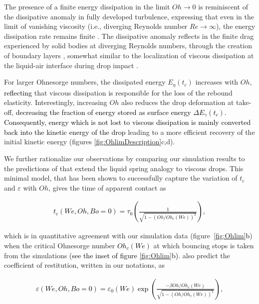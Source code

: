 \documentclass{jfm}
\newcommand{\Ohn}{\mathit{Oh}}
\newcommand{\Ohc}{\mathit{Oh}_\mathit{c}}
\newcommand{\Wen}{\mathit{We}}
\newcommand{\Ren}{\mathit{Re}}
\newcommand{\Bon}{\mathit{Bo}}
\newcommand{\revRev}[1]{\textcolor{black}{#1}}
\begin{document}
The presence of a finite energy dissipation in the limit $\Ohn \to 0$ is reminiscent of the dissipative anomaly 
in fully developed turbulence, expressing that even in the limit of vanishing viscosity (i.e., diverging Reynolds number $\Ren \to \infty$), the energy dissipation rate remains finite \citep{onsager1949statistical, eyink1994energy, kolmogorov1941local, dubrulle2019beyond, eggers2018role}.
The dissipative anomaly %
reflects in the finite drag experienced by solid bodies at diverging 
Reynolds numbers, through the creation of boundary layers \citep{prandtl1904}, somewhat 
similar to the localization of viscous dissipation at the liquid-air interface during drop impact \revRev{\citep[see the inset of figure~\ref{fig:OhlimDescription}a and][]{Philippi2016}}.

For larger Ohnesorge numbers, the dissipated energy $E_\eta(t_c)$ increases with $\Ohn$, \revRev{reflecting} that viscous dissipation is responsible for the loss of the rebound elasticity. 
Interestingly, increasing $\Ohn$ also reduces the drop deformation at take-off, \revRev{decreasing the fraction of energy stored as surface energy $\Delta E_\gamma(t_c)$. Consequently, energy which is not lost to viscous dissipation is mainly converted back into the kinetic energy of the drop} leading to a more efficient recovery of the initial kinetic energy (figures \ref{fig:OhlimDescription}c,d).

We further rationalize our observations by comparing our simulation results to the predictions of \citet{jha2020viscous} that extend the liquid spring analogy to viscous drops.
This minimal model, that has been shown to successfully capture the variation of $t_c$ and $\varepsilon$ with $\Ohn$, gives the time of apparent contact as

\revRev{\begin{align}
	\label{eqn:JhaEtAl_time}
	t_c\left(\Wen,\Ohn, \Bon = 0\right) =  \tau_0\left(\frac{1}{\sqrt{1 - \left(\Ohn/\Ohc\left(\Wen\right)\right)^{2}}}\right),
\end{align}}

\noindent which is in quantitative agreement with our simulation data (figure~\ref{fig:Ohlim}\revRev{b}) when the critical Ohnesorge number \revRev{$\Ohc(\Wen)$} at which bouncing stops is taken from the simulations \revRev{(see the inset of figure \ref{fig:Ohlim}b)}. 
\citet{jha2020viscous} also predict the coefficient of restitution, written in our notations, as

\revRev{\begin{align}
	\label{eqn:JhaEtAl_epsilon}
	\varepsilon\left(\Wen, \Ohn, \Bon = 0\right) = \varepsilon_0\left(\Wen\right)\exp\left( \frac{-\beta \Ohn/\Ohc\left(\Wen\right)}{\sqrt{1 - \left(\Ohn/\Ohc\left(\Wen\right)\right)^{2}}} \right),
\end{align}}
\end{document}
